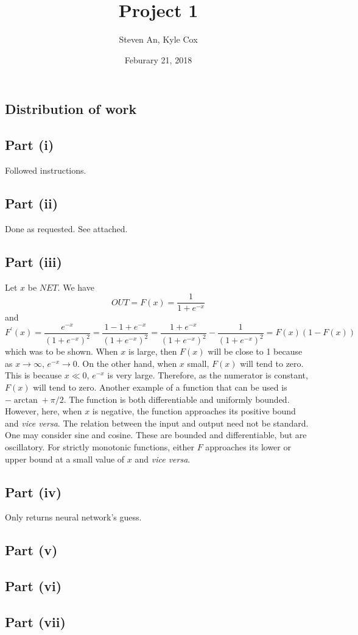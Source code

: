 \documentclass[12pt]{article}
\begin{document}
 
\title{Project 1}
\author{Steven An, Kyle Cox}
\date{Feburary 21, 2018}
\maketitle

\subsection*{Distribution of work}


\subsection*{Part (i)}
Followed instructions.

\subsection*{Part (ii)}
Done as requested.  
See attached.

\subsection*{Part (iii)}
Let $x$ be $NET$.
We have 
\[OUT = F(x) = \frac{1}{1+e^{-x}}\]
and
\[F^\prime(x) = \frac{e^{-x}}{(1+e^{-x})^2} = \frac{1-1+e^{-x}}{(1+e^{-x})^2} = \frac{1+e^{-x}}{(1+e^{-x})^2} -\frac{1}{(1+e^{-x})^2} = F(x)(1-F(x))\]
which was to be shown.
When $x$ is large, then $F(x)$ will be close to 1 because as $x\rightarrow\infty$, $e^{-x}\rightarrow 0$.
On the other hand, when $x$ small, $F(x)$ will tend to zero.
This is because $x\ll 0$, $e^{-x}$ is very large.
Therefore, as the numerator is constant, $F(x)$ will tend to zero.
Another example of a function that can be used is $-\arctan + \pi/2$.
The function is both differentiable and uniformly bounded.
However, here, when $x$ is negative, the function approaches its positive bound and \textit{vice versa}.
The relation between the input and output need not be standard.
One may consider sine and cosine.
These are bounded and differentiable, but are oscillatory.
For strictly monotonic functions, either $F$ approaches its lower or upper bound at a small value of $x$ and \textit{vice versa}.
\subsection*{Part (iv)}
Only returns neural network's guess.

\subsection*{Part (v)}


\subsection*{Part (vi)}


\subsection*{Part (vii)}
\end{document}
